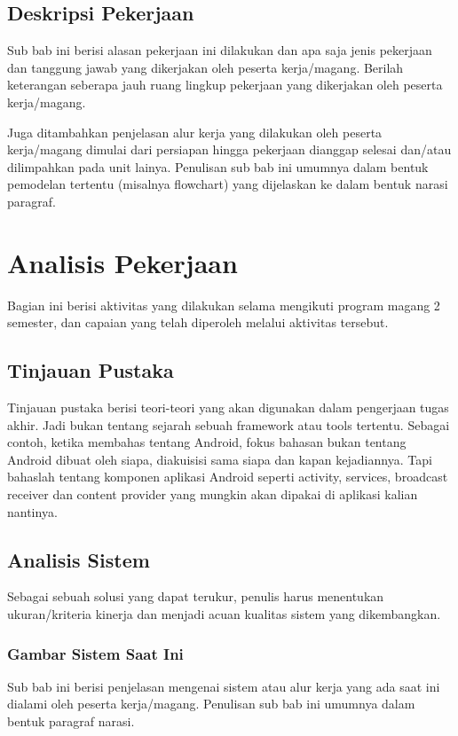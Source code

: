 \documentclass[a4paper,11pt,oneside]{report}
\begin{document}
\section{Deskripsi Pekerjaan}
Sub bab ini berisi alasan pekerjaan ini dilakukan dan apa saja jenis pekerjaan
dan tanggung jawab yang dikerjakan oleh peserta kerja/magang. Berilah keterangan
seberapa jauh ruang lingkup pekerjaan yang dikerjakan oleh peserta kerja/magang.

Juga ditambahkan penjelasan alur kerja yang dilakukan oleh peserta kerja/magang
dimulai dari persiapan hingga pekerjaan dianggap selesai dan/atau dilimpahkan
pada unit lainya. Penulisan sub bab ini umumnya dalam bentuk pemodelan tertentu
(misalnya flowchart) yang dijelaskan ke dalam bentuk narasi paragraf.

\chapter{Analisis Pekerjaan}
Bagian ini berisi aktivitas yang dilakukan selama mengikuti program magang 2
semester, dan capaian yang telah diperoleh melalui aktivitas tersebut.

\section{Tinjauan Pustaka}
Tinjauan pustaka berisi teori-teori yang akan digunakan dalam pengerjaan tugas
akhir. Jadi bukan tentang sejarah sebuah framework atau tools tertentu. Sebagai
contoh, ketika membahas tentang Android, fokus bahasan bukan tentang Android
dibuat oleh siapa, diakuisisi sama siapa dan kapan kejadiannya. Tapi bahaslah
tentang komponen aplikasi Android seperti activity, services, broadcast receiver
dan content provider yang mungkin akan dipakai di aplikasi kalian nantinya.

\section{Analisis Sistem}
Sebagai sebuah solusi yang dapat terukur, penulis harus menentukan
ukuran/kriteria kinerja dan menjadi acuan kualitas sistem yang dikembangkan.

\subsection{Gambar Sistem Saat Ini}
Sub bab ini berisi penjelasan mengenai sistem atau alur kerja yang ada saat ini
dialami oleh peserta kerja/magang. Penulisan sub bab ini umumnya dalam bentuk
paragraf narasi.
\end{document}
